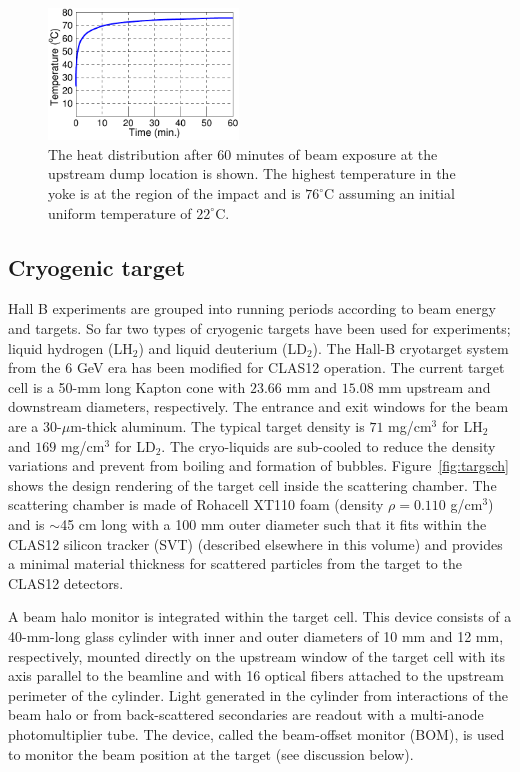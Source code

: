 \begin{figure}[hbt]
\begin{center}
\includegraphics[width=0.45\textwidth]{YokeHeating.pdf}
	\caption{The heat distribution after $60$ minutes of beam exposure at the upstream dump location is shown. The highest 
	temperature in the yoke is at the region of the impact and is $76^\circ$C assuming an initial uniform temperature of $22^\circ$C.}
\label{fig:ansys_yoke}
\end{center}
\end{figure}





\subsection{Cryogenic target}
\label{sec-cryotgt}

Hall B experiments are grouped into running periods according to beam energy and targets. So far two types of cryogenic targets have been 
used for experiments; liquid hydrogen (LH$_2$) and liquid deuterium (LD$_2$). The Hall-B cryotarget system from the $6$ GeV era  
\cite{CLAS} has been modified for CLAS12 operation.  The current target cell is a 50-mm long Kapton cone with $23.66$ mm and $15.08$ mm upstream and downstream diameters, respectively. The entrance and exit windows for the beam are a 30-$\mu$m-thick aluminum. The typical target density is $71$ mg/cm$^3$ for LH$_2$ 
and $169$ mg/cm$^3$ for LD$_2$. The cryo-liquids are sub-cooled to reduce the density variations and prevent from boiling and formation of bubbles. Figure~\ref{fig:targsch} shows the design 
rendering of the target cell inside the scattering chamber.  The scattering chamber is made of Rohacell XT110 foam (density 
$\rho=0.110$ g/cm$^3$) and is $\sim$45 cm long with a 100 mm outer diameter such that it fits within the CLAS12 silicon tracker (SVT) 
(described elsewhere in this volume) and provides a minimal material thickness for scattered particles from the target to the CLAS12 detectors.  

A beam halo monitor is integrated within the target cell. This device consists of a 40-mm-long glass cylinder with inner and outer diameters 
of 10 mm and 12 mm, respectively, mounted directly on the upstream window of the target cell with its axis parallel to the beamline and 
with 16 optical fibers attached to the upstream perimeter of the cylinder. Light generated in the cylinder 
from interactions of the beam halo or from back-scattered secondaries are readout with a multi-anode photomultiplier tube. The device, called 
the  beam-offset monitor (BOM), is used to monitor the beam position at the target (see discussion below).  

